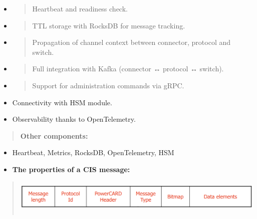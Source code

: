 \documentclass[12pt,a4paper]{report}
\begin{document}
\begin{itemize}
\item
  \begin{quote}
  Heartbeat and readiness check.
  \end{quote}
\item
  \begin{quote}
  TTL storage with RocksDB for message tracking.
  \end{quote}
\item
  \begin{quote}
  Propagation of channel context between connector, protocol and switch.
  \end{quote}
\item
  \begin{quote}
  Full integration with Kafka (connector ↔ protocol ↔ switch).
  \end{quote}
\item
  \begin{quote}
  Support for administration commands via gRPC.
  \end{quote}
\end{itemize}

\begin{itemize}
\item
  Connectivity with HSM module.
\item
  Observability thanks to OpenTelemetry.
\end{itemize}

\begin{quote}
\textbf{Other components:}
\end{quote}

\begin{itemize}
\item
  Heartbeat, Metrics, RocksDB, OpenTelemetry, HSM
\end{itemize}

\begin{itemize}
\item
  \textbf{The properties of a CIS message:}
\end{itemize}

\begin{quote}
\includegraphics[width=6.17089in,height=0.65058in]{vertopal_d1b0b2209edd4c6aa8254f57daa0953b/media/image33.png}
\end{quote}
\end{document}
